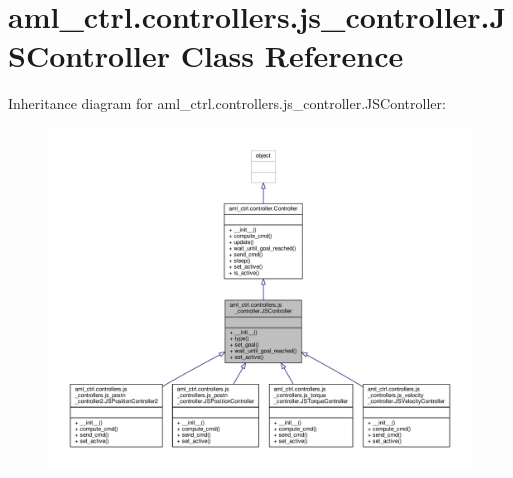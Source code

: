 \hypertarget{classaml__ctrl_1_1controllers_1_1js__controller_1_1_j_s_controller}{\section{aml\-\_\-ctrl.\-controllers.\-js\-\_\-controller.\-J\-S\-Controller Class Reference}
\label{classaml__ctrl_1_1controllers_1_1js__controller_1_1_j_s_controller}
}


Inheritance diagram for aml\-\_\-ctrl.\-controllers.\-js\-\_\-controller.\-J\-S\-Controller\-:
\nopagebreak
\begin{figure}[H]
\begin{center}
\leavevmode
\includegraphics[width=350pt]{classaml__ctrl_1_1controllers_1_1js__controller_1_1_j_s_controller__inherit__graph}
\end{center}
\end{figure}



